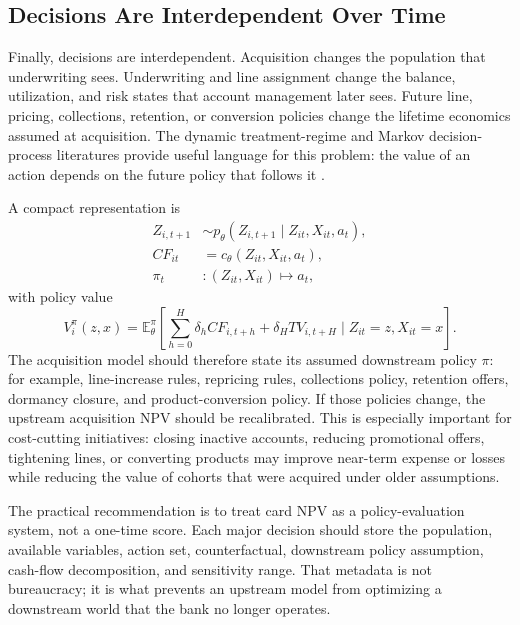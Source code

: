 \documentclass[11pt]{article}
\newcommand{\E}{\mathbb{E}}
\newcommand{\1}{\mathbf{1}}
\begin{document}
\subsection{Decisions Are Interdependent Over Time}
\label{subsec:interdependent-decisions}

Finally, decisions are interdependent. Acquisition changes the population that
underwriting sees. Underwriting and line assignment change the balance,
utilization, and risk states that account management later sees. Future line,
pricing, collections, retention, or conversion policies change the lifetime
economics assumed at acquisition. The dynamic treatment-regime and Markov
decision-process literatures provide useful language for this problem:
the value of an action depends on the future policy that follows it
\citep{puterman1994mdp,murphy2003dynamic,rust1987replacement}.

A compact representation is
\begin{align}
  Z_{i,t+1} &\sim p_\theta(Z_{i,t+1}\mid Z_{it},X_{it},a_t),\\
  CF_{it}  &= c_\theta(Z_{it},X_{it},a_t),\\
  \pi_t    &: (Z_{it},X_{it}) \mapsto a_t,
  \label{eq:dynamic-policy-system}
\end{align}
with policy value
\begin{equation}
  V^\pi_i(z,x)
  =
  \E_\theta^\pi
  \left[
    \sum_{h=0}^{H}\delta_h CF_{i,t+h}
    + \delta_H TV_{i,t+H}
    \mid Z_{it}=z,X_{it}=x
  \right].
  \label{eq:policy-value}
\end{equation}
The acquisition model should therefore state its assumed downstream policy
$\pi$: for example, line-increase rules, repricing rules, collections policy,
retention offers, dormancy closure, and product-conversion policy. If those
policies change, the upstream acquisition NPV should be recalibrated. This is
especially important for cost-cutting initiatives: closing inactive accounts,
reducing promotional offers, tightening lines, or converting products may
improve near-term expense or losses while reducing the value of cohorts that
were acquired under older assumptions.

The practical recommendation is to treat card NPV as a policy-evaluation
system, not a one-time score. Each major decision should store the population,
available variables, action set, counterfactual, downstream policy assumption,
cash-flow decomposition, and sensitivity range. That metadata is not bureaucracy;
it is what prevents an upstream model from optimizing a downstream world that
the bank no longer operates.
\end{document}
